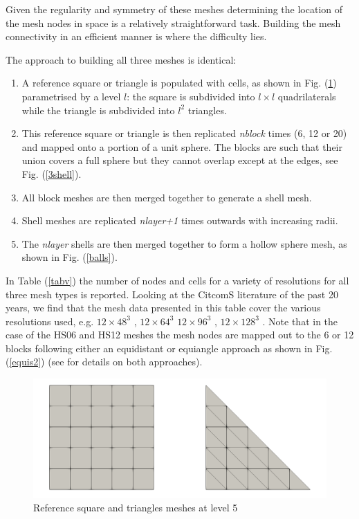 \documentclass[a4paper]{article}
\begin{document}
Given the regularity and symmetry of these meshes determining the location of the 
mesh nodes in space is a relatively straightforward task. Building the mesh connectivity in an 
efficient manner is where the difficulty lies.

The approach to building all three meshes is identical:
\begin{enumerate}
\item A reference square or triangle is populated with cells, as shown in Fig. (\ref{basics}) 
parametrised by a level $l$: the square is subdivided into $l\times l$ quadrilaterals while 
the triangle is subdivided into $l^2$ triangles.

\item This reference square or triangle is then replicated {\sl nblock} times (6, 12 or 20) and mapped
onto a portion of a unit sphere. The blocks are such that their union covers a full sphere
but they cannot overlap except at the edges, see Fig. (\ref{3shell}).

\item All block meshes are then merged together to generate a shell mesh. 
\item Shell meshes are replicated {\sl nlayer+1} times outwards with increasing radii. 
\item The {\sl nlayer} shells are then merged together to form a hollow sphere mesh, as shown in 
Fig. (\ref{balls}).
\end{enumerate}

In Table (\ref{tabv}) the number of nodes and cells for a variety of resolutions 
for all three mesh types is reported. Looking at the CitcomS literature of the past 20 years, we find that 
the mesh data presented in this table cover the various resolutions used, e.g.
$12\times48^3$ \cite{mczh04,arfw14}, $12\times64^3$ \cite{budt14}
$12\times96^3$ \cite{bumb10}, $12\times128^3$ \cite{beck06,wele16,welm16}.
Note that in the case of the HS06 and HS12 meshes the mesh nodes are mapped out to the 6 or 12 blocks 
following either an equidistant or equiangle approach as shown in Fig. (\ref{equis2}) (see \cite{puli07}
for details on both approaches). 

\begin{figure}[t]
\centering
\includegraphics[width=12cm]{images/basic_shapes/basics}
\caption{Reference square and triangles meshes at level 5 \label{basics}}
\end{figure}
\end{document}
